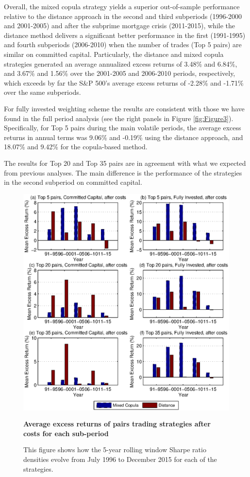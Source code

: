Overall, the mixed copula strategy yields a superior out-of-sample performance relative to the distance approach in the second and third subperiods (1996-2000 and 2001-2005) and after the subprime mortgage crisis (2011-2015), while the distance method delivers a significant better performance in the first (1991-1995) and fourth subperiods (2006-2010) when the number of trades (Top 5 pairs) are similar on committed capital. Particularly, the distance and mixed copula strategies generated an average annualized excess returns of 3.48\% and 6.84\%, and 3.67\% and 1.56\% over the 2001-2005 and 2006-2010 periods, respectively, which exceeds by far the S\&P 500's average excess returns of -2.28\% and -1.71\% over the same subperiods.

For fully invested weighting scheme the results are consistent with those we have found in the full period analysis (see the right panels in Figure \ref{fig:Figure3}). Specifically, for Top 5 pairs during the main volatile periods, the average excess returns in annual terms was 9.06\% and -0.19\% using the distance approach, and 18.07\% and 9.42\% for the copula-based method.

The results for Top 20 and Top 35 pairs are in agreement with what we expected from previous analyses. The main difference is the performance of the strategies in the second subperiod on committed capital.

\begin{figure}[!ht]
	\centering
		\includegraphics[width=\linewidth]{Figure6.eps}
	\captionsetup{justification=raggedright,
		singlelinecheck=false
	}
	\caption{\textbf{Average excess returns of pairs trading strategies after costs for each sub-period}}
	\caption*{\scriptsize This figure shows how the 5-year rolling window Sharpe ratio densities evolve from July 1996 to December 2015 for each of the strategies.}
	\label{fig:Figure6}
\end{figure}

